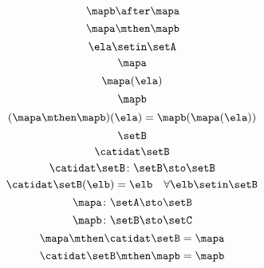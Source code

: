 \begin{forslides}
    \begin{equation}
        \label{eq:slides_session2_134}
        \mapb \after \mapa
    \end{equation}
    \begin{equation}
        \label{eq:slides_session2_135}
        \mapa \mthen \mapb
    \end{equation}
    \begin{equation}
        \label{eq:slides_session2_136}
        \ela \setin\setA
    \end{equation}
    \begin{equation}
        \label{eq:slides_session2_137}
        \mapa
    \end{equation}
    \begin{equation}
        \label{eq:slides_session2_138}
        \mapa(\ela)
    \end{equation}
    \begin{equation}
        \label{eq:slides_session2_139}
        \mapb
    \end{equation}
    \begin{equation}
        \label{eq:slides_session2_140}
        (\mapa \mthen \mapb)(\ela) = \mapb(\mapa(\ela))
    \end{equation}
    \begin{equation}
        \label{eq:slides_session2_141}
        \setB
    \end{equation}
    \begin{equation}
        \label{eq:slides_session2_142}
        \catidat\setB
    \end{equation}
    \begin{equation}
        \label{eq:slides_session2_142a}
        \catidat\setB \colon \setB \sto \setB
    \end{equation}
    \begin{equation}
        \label{eq:slides_session2_143}
        \catidat\setB(\elb) = \elb \quad \forall  \elb \setin\setB
    \end{equation}
    \begin{equation}
        \label{eq:slides_session2_144}
        \mapa \colon \setA \sto \setB
    \end{equation}
    \begin{equation}
        \label{eq:slides_session2_145}
        \mapb \colon \setB \sto \setC
    \end{equation}
    \begin{equation}
        \label{eq:slides_session2_146}
        \mapa \mthen \catidat\setB = \mapa
    \end{equation}
    \begin{equation}
        \label{eq:slides_session2_147}
        \catidat\setB \mthen \mapb = \mapb
    \end{equation}


\end{forslides}
